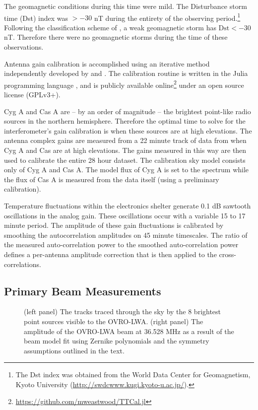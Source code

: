 \documentclass[twocolumn]{aastex61}
\begin{document}
The geomagnetic conditions during this time were mild. The Disturbance storm time (Dst) index was
$>-30$ nT during the entirety of the observing period.\footnote{
    The Dst index was obtained from the World Data Center for Geomagnetism, Kyoto University
    (\url{http://swdcwww.kugi.kyoto-u.ac.jp/}).
}
Following the classification scheme of \citet{2008GMS...181.....K}, a weak geomagnetic storm has
$\text{Dst} < -30$ nT. Therefore there were no geomagnetic storms during the time of these
observations.

Antenna gain calibration is accomplished using an iterative method independently developed by
\citet{2008ISTSP...2..707M} and \citet{2014A&A...571A..97S}. The calibration routine is written in
the Julia programming language \citep{doi:10.1137/141000671}, and is publicly available
online\footnote{\url{https://github.com/mweastwood/TTCal.jl}} under an open source license (GPLv3+).

Cyg A and Cas A are -- by an order of magnitude -- the brightest point-like radio sources in the
northern hemisphere. Therefore the optimal time to solve for the interferometer's gain calibration
is when these sources are at high elevations.  The antenna complex gains are measured from a 22
minute track of data from when Cyg A and Cas are at high elevations. The gains measured in this way
are then used to calibrate the entire 28 hour dataset. The calibration sky model consists only of
Cyg A and Cas A. The model flux of Cyg A is set to the \citet{1977A&A....61...99B} spectrum while
the flux of Cas A is measured from the data itself (using a preliminary calibration).

Temperature fluctuations within the electronics shelter generate 0.1 dB sawtooth oscillations in the
analog gain. These oscillations occur with a variable 15 to 17 minute period. The amplitude of these
gain fluctuations is calibrated by smoothing the autocorrelation amplitudes on 45 minute timescales.
The ratio of the measured auto-correlation power to the smoothed auto-correlation power defines a
per-antenna amplitude correction that is then applied to the cross-correlations.

\subsection{Primary Beam Measurements}

\begin{figure*}[ht]
    \caption{
        (left panel) The tracks traced through the sky by the 8 brightest point sources visible to the
        OVRO-LWA.
        (right panel) The amplitude of the OVRO-LWA beam at 36.528 MHz as a result of the beam model
        fit using Zernike polynomials and the symmetry assumptions outlined in the text.
    }
    \label{fig:beam}
\end{figure*}
\end{document}
